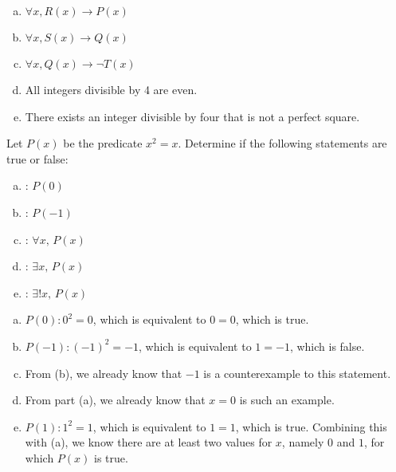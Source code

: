 \documentclass[11pt,letterpaper]{article}
\begin{document}
\sol
\begin{enumerate}[(a)]
\item $\forall x, R(x) \to P(x)$

\item $\forall x, S(x) \to Q(x)$

\item $\forall x, Q(x) \to \neg T(x)$

\item All integers divisible by 4 are even.

\item There exists an integer divisible by four that is not a perfect square. 
\end{enumerate}





\newpage





 Let $P(x)$ be the predicate $x^2= x$. Determine if the following statements are true or false:
	\begin{enumerate}[(a)]
	\item {}: $P(0)$
	\item {}: $P(-1)$
	\item {}: $\forall x,\, P(x)$
	\item {}: $\exists x,\, P(x)$
	\item {}: $\exists! x,\, P(x)$
	\end{enumerate} \pspace

\sol
\begin{enumerate}[(a)]
\item $P(0) \colon 0^2= 0$, which is equivalent to $0= 0$, which is true. 

\item $P(-1) \colon (-1)^2= -1$, which is equivalent to $1= -1$, which is false.

\item From (b), we already know that $-1$ is a counterexample to this statement. 

\item From part (a), we already know that $x= 0$ is such an example. 

\item $P(1) \colon 1^2= 1$, which is equivalent to $1= 1$, which is true. Combining this with (a), we know there are at least two values for $x$, namely $0$ and $1$, for which $P(x)$ is true. 
\end{enumerate}
\end{document}
